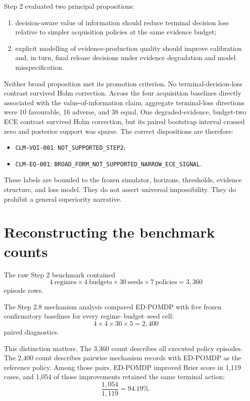 \documentclass[11pt,a4paper]{article}
\begin{document}
Step 2 evaluated two principal propositions:
\begin{enumerate}
  \item decision-aware value of information should reduce terminal decision loss relative to simpler acquisition policies at the same evidence budget;
  \item explicit modelling of evidence-production quality should improve calibration and, in turn, final release decisions under evidence degradation and model misspecification.
\end{enumerate}

Neither broad proposition met its promotion criterion. No terminal-decision-loss contrast survived Holm correction. Across the four acquisition baselines directly associated with the value-of-information claim, aggregate terminal-loss directions were 10 favourable, 16 adverse, and 38 equal. One degraded-evidence, budget-two ECE contrast survived Holm correction, but its paired bootstrap interval crossed zero and posterior support was sparse. The correct dispositions are therefore:
\begin{itemize}
  \item \texttt{CLM-VOI-001}: \texttt{NOT\_SUPPORTED\_STEP2};
  \item \texttt{CLM-EQ-001}: \texttt{BROAD\_FORM\_NOT\_SUPPORTED\_NARROW\_ECE\_SIGNAL}.
\end{itemize}

These labels are bounded to the frozen simulator, horizons, thresholds, evidence structure, and loss model. They do not assert universal impossibility. They do prohibit a general superiority narrative.

\section{Reconstructing the benchmark counts}

The raw Step 2 benchmark contained
\[
4\ \text{regimes}\times 4\ \text{budgets}\times 30\ \text{seeds}\times 7\ \text{policies}=3{,}360
\]
episode rows.

The Step 2.8 mechanism analysis compared ED-POMDP with five frozen confirmatory baselines for every regime--budget--seed cell:
\[
4\times 4\times 30\times 5=2{,}400
\]
paired diagnostics.

This distinction matters. The 3,360 count describes all executed policy episodes. The 2,400 count describes pairwise mechanism records with ED-POMDP as the reference policy. Among those pairs, ED-POMDP improved Brier score in 1,119 cases, and 1,054 of those improvements retained the same terminal action:
\[
\frac{1{,}054}{1{,}119}=94.19\%.
\]
\end{document}
